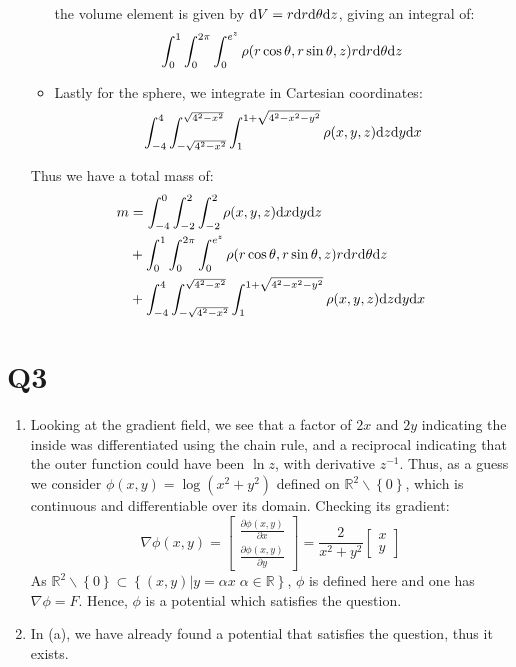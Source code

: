 \documentclass[a4paper, 11pt]{article}
\newcommand{\RR}{\mathbb{R}}
\def\set#1{\left\{ #1 \right\}}
\begin{document}
\begin{enumerate}[label=(\alph*)]
\begin{itemize}
		            the volume element is given by $\text dV = r\text d r\text d
			            \theta \text d z$, giving an integral of:
		            \[
			            \int_0^1\int_0^{2\pi}\int_0^{e^z} \rho(r\cos\theta,r\sin\theta,z) r\text d r\text d
			            \theta \text d z
		            \]
		      \item Lastly for the sphere, we integrate in Cartesian
		            coordinates:
		            \[
			            \int_{-4}^4\int_{-\sqrt{4^2-x^2}}^{\sqrt{4^2-x^2}}\int_1^{1+\sqrt{4^2-x^2-y^2}}\rho(x,y,z) \text d z\text d y\text d x
		            \]
	      \end{itemize}
	      Thus we have a total mass of:
	      \begin{align*}
		      m & =\int_{-4}^0\int_{-2}^2\int_{-2}^2\rho(x,y,z)\text d x \text d y \text
		      d z                                                                                                                         \\
		        & +\int_0^1\int_0^{2\pi}\int_0^{e^z} \rho(r\cos\theta,r\sin\theta,z) r\text d r\text d
		      \theta \text d z                                                                                                            \\
		        & +\int_{-4}^4\int_{-\sqrt{4^2-x^2}}^{\sqrt{4^2-x^2}}\int_1^{1+\sqrt{4^2-x^2-y^2}}\rho(x,y,z) \text d z\text d y\text d x
	      \end{align*}
\end{enumerate}


\section*{Q3}
\begin{enumerate}[label=(\alph*)]

	\item Looking at the gradient field,  we see that a factor of $2x$ and $2y$ indicating the inside was differentiated using the chain rule, and a reciprocal indicating that the outer function could have been $\ln z$, with derivative $z^{-1}$. Thus, as a guess we consider $\phi(x,y)=\log(x^2+y^2)$ defined on $\RR^2\backslash\set{0}$, which is continuous and differentiable over its domain. Checking its gradient:
	      \[
		      \nabla\phi(x,y)
		      =\begin{bmatrix}
			      \frac{\partial \phi(x,y)}{\partial x} \\
			      \frac{\partial \phi(x,y)}{\partial y}
		      \end{bmatrix}
		      =\frac 2{x^2+y^2}
		      \begin{bmatrix}
			      x \\y
		      \end{bmatrix}
	      \]
	      As $\RR^2\backslash\set0\subset\set{(x,y)|y=\alpha x\;\alpha\in\RR}$, $\phi$ is defined here and one has $\nabla\phi=F$. Hence, $\phi$ is a potential which satisfies the question.

	\item In (a), we have already found a potential that satisfies the question, thus it exists.

\end{enumerate}
\end{document}
